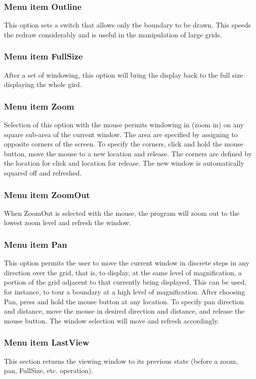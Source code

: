 \documentclass{article}
\begin{document}
\subsubsection{Menu item Outline}
This option sets a switch that allows only the boundary to be drawn. This speeds the redraw considerably and is useful in the manipulation of large grids.

\subsubsection{Menu item FullSize}
After a set of windowing, this option will bring the display back to the full size displaying the whole gird.

\subsubsection{Menu item Zoom}
Selection of this option with the mouse permits windowing in (zoom in) on any square sub-area of the current window. The area are specified by assigning to opposite corners of the screen. To specify the corners, click and hold the mouse button, move the mouse to a new location and release. The corners are defined by the location for click and location for release. The new window is automatically squared off and refreshed.

\subsubsection{Menu item ZoomOut}
When ZoomOut is selected with the mouse, the program will zoom out to the lowest zoom level and refresh the window. 

\subsubsection{Menu item Pan}
This option permits the user to move the current window in discrete steps in any direction over the grid, that is, to display, at the same level of magnification, a portion of the grid adjacent to that currently being displayed. This can be used, for instance, to tour a boundary at a high level of magnification. After choosing Pan, press and hold the mouse button at any location. To specify pan direction and distance, move the mouse in desired direction and distance, and release the mouse button. The window selection will move and refresh accordingly.

\subsubsection{Menu item LastView}
This section returns the viewing window to its previous state (before a zoom, pan, FullSize, etc. operation).
\end{document}
